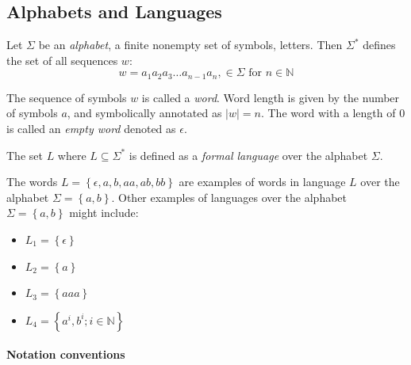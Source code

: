 \subsection{Alphabets and Languages}


\begin{definition}[Alphabet]
\label{def:alphabet}
Let $\Sigma$ be an \emph{alphabet}, a finite nonempty set of symbols, letters. Then $\Sigma ^{*}$ defines the set of all sequences $w$:
$$w= a_1 a_2 a_3 \dots a_{n-1} a_n, \in \Sigma \text{ for } n \in \mathbb{N}$$
\end{definition}

The sequence of symbols $w$ is called a \emph{word}. Word length is given by the number of symbols $a$, and symbolically annotated as $|w| = n$. The word with a length of 0 is called an \emph{empty word} denoted as $\epsilon$.

\begin{definition}[Language]
\label{def:language}
The set $L$ where $L\subseteq \Sigma^{*}$ is defined as a \emph{formal language} over the alphabet $\Sigma$. 
\end{definition}
The words $L = \left\lbrace \epsilon, a, b, aa, ab, bb \right\rbrace$ are examples of words in language $L$ over the alphabet $\Sigma=\left\lbrace a,b \right\rbrace$.
Other examples of languages over the alphabet $\Sigma=\left\lbrace a,b \right\rbrace$ might include:
\begin{itemize}
\item $L_1 = \left\lbrace \epsilon \right\rbrace$
\item $L_2 = \left\lbrace a \right\rbrace$
\item $L_3 = \left\lbrace aaa \right\rbrace$
\item $L_4 = \left\lbrace a^i,b^i; i \in \mathbb{N} \right\rbrace$
\end{itemize}




\paragraph*{Notation conventions}



